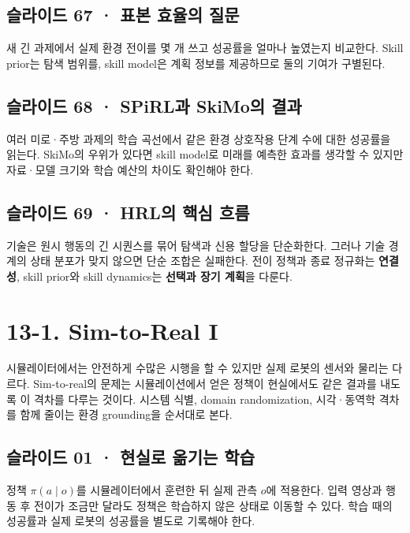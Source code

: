 \documentclass[11pt,a4paper]{article}
\begin{document}
\subsection{슬라이드 67 · 표본 효율의 질문}

새 긴 과제에서 실제 환경 전이를 몇 개 쓰고 성공률을 얼마나 높였는지 비교한다. Skill prior는 탐색 범위를, skill model은 계획 정보를 제공하므로 둘의 기여가 구별된다.\par

\subsection{슬라이드 68 · SPiRL과 SkiMo의 결과}

여러 미로·주방 과제의 학습 곡선에서 같은 환경 상호작용 단계 수에 대한 성공률을 읽는다. SkiMo의 우위가 있다면 skill model로 미래를 예측한 효과를 생각할 수 있지만 자료·모델 크기와 학습 예산의 차이도 확인해야 한다.\par

\subsection{슬라이드 69 · HRL의 핵심 흐름}

기술은 원시 행동의 긴 시퀀스를 묶어 탐색과 신용 할당을 단순화한다. 그러나 기술 경계의 상태 분포가 맞지 않으면 단순 조합은 실패한다. 전이 정책과 종료 정규화는 \textbf{연결성}, skill prior와 skill dynamics는 \textbf{선택과 장기 계획}을 다룬다.\par

\clearpage
\section{13-1. Sim-to-Real I}


시뮬레이터에서는 안전하게 수많은 시행을 할 수 있지만 실제 로봇의 센서와 물리는 다르다. Sim-to-real의 문제는 시뮬레이션에서 얻은 정책이 현실에서도 같은 결과를 내도록 이 격차를 다루는 것이다. 시스템 식별, domain randomization, 시각·동역학 격차를 함께 줄이는 환경 grounding을 순서대로 본다.\par

\subsection{슬라이드 01 · 현실로 옮기는 학습}

정책 $\pi(a\mid o)$를 시뮬레이터에서 훈련한 뒤 실제 관측 $o$에 적용한다. 입력 영상과 행동 후 전이가 조금만 달라도 정책은 학습하지 않은 상태로 이동할 수 있다. 학습 때의 성공률과 실제 로봇의 성공률을 별도로 기록해야 한다.\par
\end{document}
